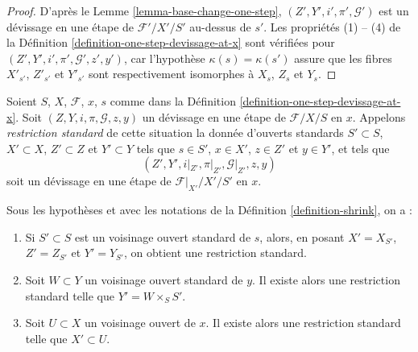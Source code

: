 \begin{proof}
D'après le
Lemme \ref{lemma-base-change-one-step},
$(Z', Y', i', \pi', \mathcal{G}')$ est un d\'evissage en une étape de
$\mathcal{F}'/X'/S'$ au-dessus de $s'$. Les propriétés (1) -- (4) de la
Définition \ref{definition-one-step-devissage-at-x}
sont vérifiées pour $(Z', Y', i', \pi', \mathcal{G}', z', y')$,
car l'hypothèse $\kappa(s) = \kappa(s')$ assure que les fibres
$X'_{s'}$, $Z'_{s'}$ et $Y'_{s'}$ sont respectivement isomorphes à
$X_s$, $Z_s$ et $Y_s$.
\end{proof}

\begin{definition}
\label{definition-shrink}
Soient $S$, $X$, $\mathcal{F}$, $x$, $s$ comme dans la
Définition \ref{definition-one-step-devissage-at-x}.\newline
Soit $(Z, Y, i, \pi, \mathcal{G}, z, y)$ un d\'evissage en une étape
de $\mathcal{F}/X/S$ en $x$. Appelons
{\it restriction standard} de cette situation la donnée
d'ouverts standards $S' \subset S$, $X' \subset X$, $Z' \subset Z$
et $Y' \subset Y$ tels que $s \in S'$, $x \in X'$, $z \in Z'$ et
$y \in Y'$, et tels que
$$
(Z', Y', i|_{Z'}, \pi|_{Z'}, \mathcal{G}|_{Z'}, z, y)
$$
soit un d\'evissage en une étape de $\mathcal{F}|_{X'}/X'/S'$ en $x$.
\end{definition}

\begin{lemma}
\label{lemma-shrink}
Sous les hypothèses et avec les notations de la
Définition \ref{definition-shrink},
on a :
\begin{enumerate}
\item
\label{item-shrink-base}
Si $S' \subset S$ est un voisinage ouvert standard de $s$, alors,
en posant $X' = X_{S'}$, $Z' = Z_{S'}$ et $Y' = Y_{S'}$, on obtient une
restriction standard.
\item
\label{item-shrink-on-Y}
Soit $W \subset Y$ un voisinage ouvert standard de $y$.
Il existe alors une restriction standard telle que $Y' = W \times_S S'$.
\item
\label{item-shrink-on-X}
Soit $U \subset X$ un voisinage ouvert de $x$.
Il existe alors une restriction standard telle que $X' \subset U$.
\end{enumerate}
\end{lemma}

